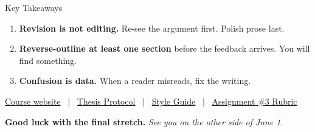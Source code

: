 \documentclass[aspectratio=169,11pt]{beamer}
\begin{document}
\begin{frame}{Key Takeaways}
    \begin{enumerate}
        \setlength{\itemsep}{0.35cm}
        \item \textbf{Revision is not editing.} Re-see the argument first. Polish prose last.
        \item \textbf{Reverse-outline at least one section} before the feedback arrives. You will find something.
        \item \textbf{Confusion is data.} When a reader misreads, fix the writing.
    \end{enumerate}
    \vspace{0.5cm}
    \begin{center}
        \footnotesize
        \textcolor{SlateBlue}{\href{https://scdenney.github.io/baks_thesis-seminar/}{Course website}} ~|~
        \textcolor{SlateBlue}{\href{https://scdenney.github.io/baks_thesis-seminar/protocol/}{Thesis Protocol}} ~|~
        \textcolor{SlateBlue}{\href{https://scdenney.github.io/baks_thesis-seminar/style-guide/}{Style Guide}} ~|~
        \textcolor{SlateBlue}{\href{https://scdenney.github.io/baks_thesis-seminar/assignments/}{Assignment \#3 Rubric}}
    \end{center}
    \vspace{0.3cm}
    \begin{center}
        {\color{AccentBlue}\large\bfseries Good luck with the final stretch.} \quad
        {\color{TextMuted}\itshape See you on the other side of June 1.}
    \end{center}
\end{frame}
\end{document}

